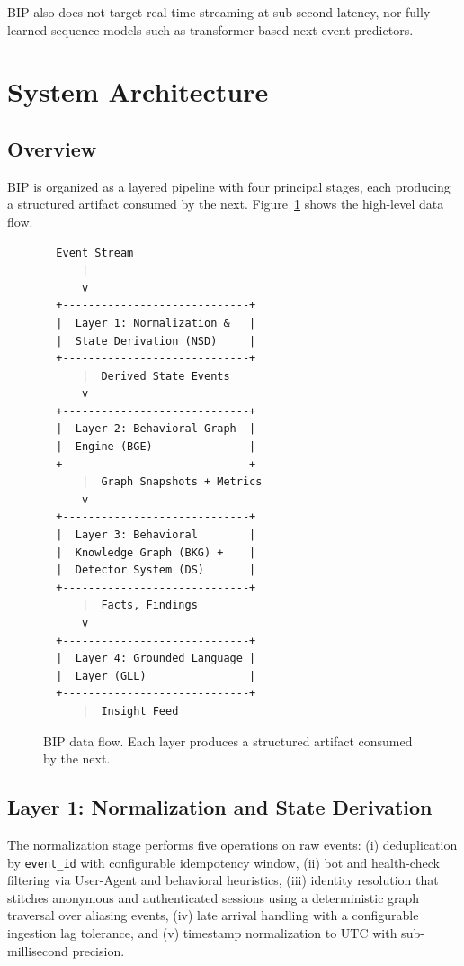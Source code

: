 \documentclass[12pt, a4paper]{article}
\begin{document}
BIP also does not target real-time streaming at sub-second latency, nor fully learned sequence models such as transformer-based next-event predictors.

\section{System Architecture}
\label{sec:architecture}

\subsection{Overview}

BIP is organized as a layered pipeline with four principal stages, each producing a structured artifact consumed by the next. Figure~\ref{fig:architecture} shows the high-level data flow.

\begin{figure}[h]
\begin{lstlisting}
  Event Stream
      |
      v
  +-----------------------------+
  |  Layer 1: Normalization &   |
  |  State Derivation (NSD)     |
  +-----------------------------+
      |  Derived State Events
      v
  +-----------------------------+
  |  Layer 2: Behavioral Graph  |
  |  Engine (BGE)               |
  +-----------------------------+
      |  Graph Snapshots + Metrics
      v
  +-----------------------------+
  |  Layer 3: Behavioral        |
  |  Knowledge Graph (BKG) +    |
  |  Detector System (DS)       |
  +-----------------------------+
      |  Facts, Findings
      v
  +-----------------------------+
  |  Layer 4: Grounded Language |
  |  Layer (GLL)                |
  +-----------------------------+
      |  Insight Feed
\end{lstlisting}
\caption{BIP data flow. Each layer produces a structured artifact consumed by the next.}
\label{fig:architecture}
\end{figure}

\subsection{Layer 1: Normalization and State Derivation}

The normalization stage performs five operations on raw events: (i) deduplication by \texttt{event\_id} with configurable idempotency window, (ii) bot and health-check filtering via User-Agent and behavioral heuristics, (iii) identity resolution that stitches anonymous and authenticated sessions using a deterministic graph traversal over aliasing events, (iv) late arrival handling with a configurable ingestion lag tolerance, and (v) timestamp normalization to UTC with sub-millisecond precision.
\end{document}
